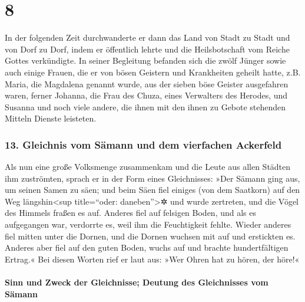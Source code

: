 \hypertarget{section-7}{%
\section{8}\label{section-7}}

 In der folgenden Zeit durchwanderte er dann das Land von
Stadt zu Stadt und von Dorf zu Dorf, indem er öffentlich lehrte und die
Heilsbotschaft vom Reiche Gottes verkündigte. In seiner Begleitung
befanden sich die zwölf Jünger  sowie auch einige Frauen,
die er von bösen Geistern und Krankheiten geheilt hatte, z.B. Maria, die
Magdalena genannt wurde, aus der sieben böse Geister ausgefahren waren,
 ferner Johanna, die Frau des Chuza, eines Verwalters des
Herodes, und Susanna und noch viele andere, die ihnen mit den ihnen zu
Gebote stehenden Mitteln Dienste leisteten.

\hypertarget{gleichnis-vom-suxe4mann-und-dem-vierfachen-ackerfeld}{%
\subsubsection{13. Gleichnis vom Sämann und dem vierfachen
Ackerfeld}\label{gleichnis-vom-suxe4mann-und-dem-vierfachen-ackerfeld}}

 Als nun eine große Volksmenge zusammenkam und die Leute
aus allen Städten ihm zuströmten, sprach er in der Form eines
Gleichnisses:  »Der Sämann ging aus, um seinen Samen zu
säen; und beim Säen fiel einiges (von dem Saatkorn) auf den Weg
längshin\textless sup title=``oder: daneben''\textgreater✲ und wurde
zertreten, und die Vögel des Himmels fraßen es auf. 
Anderes fiel auf felsigen Boden, und als es aufgegangen war, verdorrte
es, weil ihm die Feuchtigkeit fehlte.  Wieder anderes fiel
mitten unter die Dornen, und die Dornen wuchsen mit auf und erstickten
es.  Anderes aber fiel auf den guten Boden, wuchs auf und
brachte hundertfältigen Ertrag.« Bei diesen Worten rief er laut aus:
»Wer Ohren hat zu hören, der höre!«

\hypertarget{sinn-und-zweck-der-gleichnisse-deutung-des-gleichnisses-vom-suxe4mann}{%
\paragraph{Sinn und Zweck der Gleichnisse; Deutung des Gleichnisses vom
Sämann}\label{sinn-und-zweck-der-gleichnisse-deutung-des-gleichnisses-vom-suxe4mann}}

